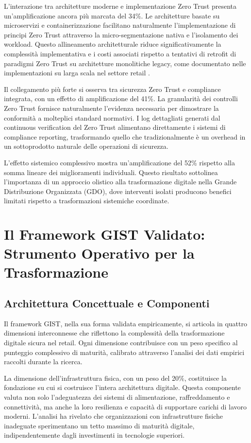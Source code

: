 L'interazione tra architetture moderne e implementazione Zero Trust presenta un'amplificazione ancora più marcata del 34\%. Le architetture basate su microservizi e containerizzazione facilitano naturalmente l'implementazione di principi Zero Trust attraverso la micro-segmentazione nativa e l'isolamento dei workload. Questo allineamento architetturale riduce significativamente la complessità implementativa e i costi associati rispetto a tentativi di retrofit di paradigmi Zero Trust su architetture monolitiche legacy, come documentato nelle implementazioni su larga scala nel settore retail \autocite{chen2023zerotrust}.

Il collegamento più forte si osserva tra sicurezza Zero Trust e compliance integrata, con un effetto di amplificazione del 41\%. La granularità dei controlli Zero Trust fornisce naturalmente l'evidenza necessaria per dimostrare la conformità a molteplici standard normativi. I log dettagliati generati dal continuous verification del Zero Trust alimentano direttamente i sistemi di compliance reporting, trasformando quello che tradizionalmente è un overhead in un sottoprodotto naturale delle operazioni di sicurezza.

L'effetto sistemico complessivo mostra un'amplificazione del 52\% rispetto alla somma lineare dei miglioramenti individuali. Questo risultato sottolinea l'importanza di un approccio olistico alla trasformazione digitale nella Grande Distribuzione Organizzata (GDO), dove interventi isolati producono benefici limitati rispetto a trasformazioni sistemiche coordinate.

\section{Il Framework GIST Validato: Strumento Operativo per la Trasformazione}

\subsection{Architettura Concettuale e Componenti}

Il framework GIST, nella sua forma validata empiricamente, si articola in quattro dimensioni interconnesse che riflettono la complessità della trasformazione digitale sicura nel retail. Ogni dimensione contribuisce con un peso specifico al punteggio complessivo di maturità, calibrato attraverso l'analisi dei dati empirici raccolti durante la ricerca.

La dimensione dell'infrastruttura fisica, con un peso del 20\%, costituisce la fondazione su cui si costruisce l'intera architettura digitale. Questa componente valuta non solo l'adeguatezza dei sistemi di alimentazione, raffreddamento e connettività, ma anche la loro resilienza e capacità di supportare carichi di lavoro moderni. L'analisi ha rivelato che organizzazioni con infrastrutture fisiche inadeguate sperimentano un tetto massimo di maturità digitale, indipendentemente dagli investimenti in tecnologie superiori.

